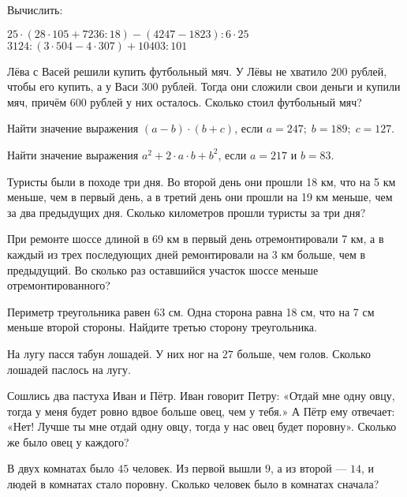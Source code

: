 %
%

\begin{class}[number=1]
	\begin{listofex}
	\item Вычислить:
	\begin{tasks}
		\task \( 25\cdot(28\cdot105+7236:18)-(4247-1823):6\cdot25 \)
		\task \( 3124:(3\cdot504-4\cdot307)+10403:101 \)
	\end{tasks}
	\item Лёва с Васей решили купить футбольный мяч. У Лёвы не хватило \( 200 \) рублей, чтобы его
	купить, а у Васи \( 300 \) рублей. Тогда они сложили свои деньги и купили мяч,
	причём \( 600 \) рублей у них осталось. Сколько стоил футбольный мяч?
	\item Найти значение выражения \( (a-b)\cdot(b+c) \), если \( a=247;\; b=189;\; c=127 \).
	\item Найти значение выражения \( a^2+2\cdot a\cdot b + b^2 \), если \( a=217 \) и \( b=83 \).
	\end{listofex}
\end{class}

\begin{class}[number=2]
	\begin{listofex}
	\item Туристы были в походе три дня. Во второй день они прошли 18 км, что на 5 км меньше,
	чем в первый день, а в третий день они прошли на 19 км меньше, чем за два предыдущих дня.
	Сколько километров прошли туристы за три дня?
	\item При ремонте шоссе длиной в 69 км в первый день отремонтировали 7 км, а в каждый из
	трех последующих дней ремонтировали на 3 км больше, чем в предыдущий. Во сколько раз
	оставшийся участок шоссе меньше отремонтированного?
	\item Периметр треугольника равен 63 см. Одна сторона равна 18 см, что на 7 см меньше второй стороны. Найдите третью сторону треугольника.
	\item На лугу пасся табун лошадей. У них ног на \( 27 \) больше, чем голов. Сколько лошадей паслось на лугу.
	\item Сошлись два пастуха Иван и Пётр. Иван говорит Петру: «Отдай мне одну овцу,
	тогда у меня будет ровно вдвое больше овец, чем у тебя.» А Пётр ему отвечает: «Нет!
	Лучше ты мне отдай одну овцу, тогда у нас овец будет поровну». Сколько же было овец у
	каждого?
	\item В двух комнатах было \( 45 \) человек. Из первой вышли \( 9 \), а из второй --- \( 14 \), и людей в комнатах стало поровну. Сколько человек было в комнатах сначала?
	\end{listofex}
\end{class}

